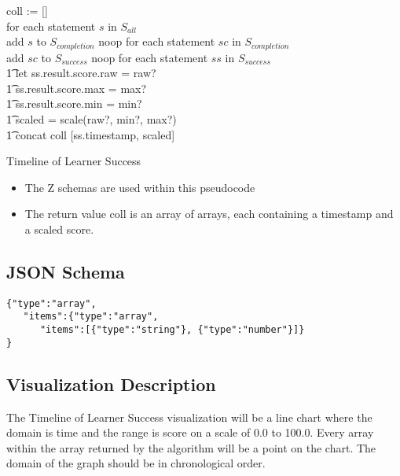 \documentclass{article}
\begin{document}
\begin{algorithm}[H]
  \SetAlgoLined
  coll := [] \\
   {
    for each statement $s$ in $S_{all}$ \\
    {
      add $s$ to $S_{completion}$
    }
    {
      noop
    }}
   {
    for each statement $sc$ in $S_{completion}$ \\
    {
      add $sc$ to $S_{success}$
    }
    {
      noop
    }}
   {
    for each statement $ss$ in $S_{success}$ \\
    \t1 let ss.result.score.raw = raw? \\ \t1 \:\:\:\:\:
    ss.result.score.max = max? \\ \t1 \:\:\:\:\:
    ss.result.score.min = min? \\ \t1 \:\:\:\:\:
    scaled = scale(raw?, min?, max?) \\
    \t1 concat coll [ss.timestamp, scaled]
  }
  \caption{Timeline of Learner Success}
\end{algorithm}
\begin{itemize}
\item The Z schemas are used within this pseudocode
\item The return value coll is an array of arrays, each containing a
  timestamp and a scaled score.
\end{itemize}

\subsection{JSON Schema}
\begin{lstlisting}[style=json]
{"type":"array",
   "items":{"type":"array",
      "items":[{"type":"string"}, {"type":"number"}]}
}
\end{lstlisting}

\subsection{Visualization Description}

The Timeline of Learner Success visualization will be a line chart
where the domain is time and the range is score on a scale of 0.0 to
100.0. Every array within the array returned by the algorithm will
be a point on the chart.  The domain of the graph should be in
chronological order. \\
\end{document}
